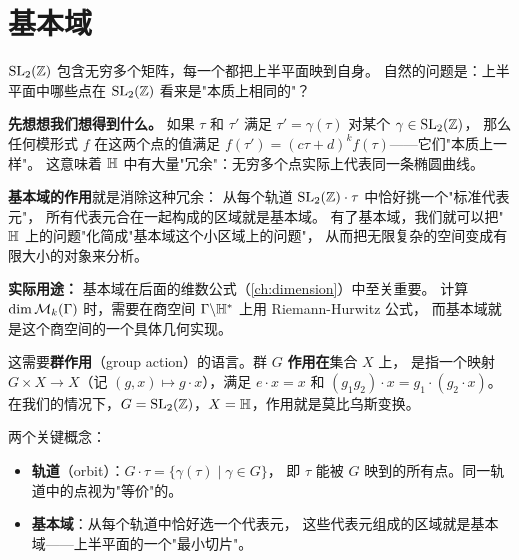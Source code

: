 \section{基本域}
\label{sec:fundamental-domain}

$\mathrm{SL}_2(\mathbb{Z})$ 包含无穷多个矩阵，每一个都把上半平面映到自身。
自然的问题是：上半平面中哪些点在 $\mathrm{SL}_2(\mathbb{Z})$ 看来是"本质上相同的"？

\textbf{先想想我们想得到什么。}
如果 $\tau$ 和 $\tau'$ 满足 $\tau' = \gamma(\tau)$ 对某个 $\gamma \in \mathrm{SL}_2(\mathbb{Z})$，
那么任何模形式 $f$ 在这两个点的值满足
$f(\tau') = (c\tau+d)^k f(\tau)$——它们"本质上一样"。
这意味着 $\mathbb{H}$ 中有大量"冗余"：无穷多个点实际上代表同一条椭圆曲线。

\textbf{基本域的作用}就是消除这种冗余：
从每个轨道 $\mathrm{SL}_2(\mathbb{Z}) \cdot \tau$ 中恰好挑一个"标准代表元"，
所有代表元合在一起构成的区域就是基本域。
有了基本域，我们就可以把"$\mathbb{H}$ 上的问题"化简成"基本域这个小区域上的问题"，
从而把无限复杂的空间变成有限大小的对象来分析。

\textbf{实际用途：}
基本域在后面的维数公式（\cref{ch:dimension}）中至关重要。
计算 $\dim \mathcal{M}_k(\Gamma)$ 时，需要在商空间 $\Gamma \backslash \mathbb{H}^*$ 上用 Riemann-Hurwitz 公式，
而基本域就是这个商空间的一个具体几何实现。

这需要\textbf{群作用}（group action）的语言。群 $G$ \textbf{作用在}集合 $X$ 上，
是指一个映射 $G \times X \to X$（记 $(g, x) \mapsto g \cdot x$），满足
$e \cdot x = x$ 和 $(g_1 g_2) \cdot x = g_1 \cdot (g_2 \cdot x)$。
在我们的情况下，$G = \mathrm{SL}_2(\mathbb{Z})$，$X = \mathbb{H}$，作用就是莫比乌斯变换。

两个关键概念：
\begin{itemize}
  \item \textbf{轨道}（orbit）：$G \cdot \tau = \{\gamma(\tau) \mid \gamma \in G\}$，
    即 $\tau$ 能被 $G$ 映到的所有点。同一轨道中的点视为"等价"的。
  \item \textbf{基本域}：从每个轨道中恰好选一个代表元，
    这些代表元组成的区域就是基本域——上半平面的一个"最小切片"。
\end{itemize}

